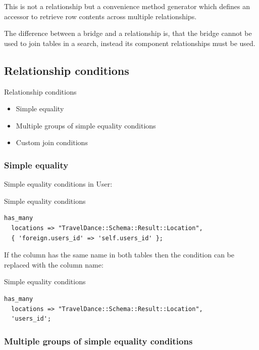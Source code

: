 This is not a relationship but a convenience method generator which defines an
accessor to retrieve row contents across multiple relationships.

The difference between a bridge and a relationship is, that the bridge
cannot be used to join tables in a search, instead its component
relationships must be used.

\subsection{Relationship conditions}

\begin{frame}{Relationship conditions}
\begin{itemize}
\item Simple equality
\item Multiple groups of simple equality conditions
\item Custom join conditions
\end{itemize}
\end{frame}

\subsubsection{Simple equality}

Simple equality conditions
in User:

\begin{frame}[fragile]{Simple equality conditions}
\begin{lstlisting}
has_many
  locations => "TravelDance::Schema::Result::Location",
  { 'foreign.users_id' => 'self.users_id' };
\end{lstlisting}
\end{frame}

If the column has the same name in both tables then the condition can be replaced with the column name:

\begin{frame}[fragile]{Simple equality conditions}
\begin{lstlisting}
has_many
  locations => "TravelDance::Schema::Result::Location",
  'users_id';
\end{lstlisting}
\end{frame}

\subsubsection{Multiple groups of simple equality conditions}

